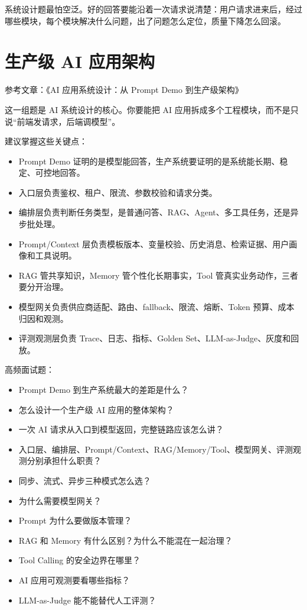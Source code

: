 \documentclass[10pt,a4paper]{ctexart}
\begin{document}
系统设计题最怕空泛。好的回答要能沿着一次请求说清楚：用户请求进来后，经过哪些模块，每个模块解决什么问题，出了问题怎么定位，质量下降怎么回滚。



\section{生产级 AI 应用架构}


参考文章：《AI 应用系统设计：从 Prompt Demo 到生产级架构》



这一组题是 AI 系统设计的核心。你要能把 AI 应用拆成多个工程模块，而不是只说“前端发请求，后端调模型”。



建议掌握这些关键点：


\begin{itemize}[itemsep=2pt, topsep=4pt]
  \item Prompt Demo 证明的是模型能回答，生产系统要证明的是系统能长期、稳定、可控地回答。
  \item 入口层负责鉴权、租户、限流、参数校验和请求分类。
  \item 编排层负责判断任务类型，是普通问答、RAG、Agent、多工具任务，还是异步批处理。
  \item Prompt/Context 层负责模板版本、变量校验、历史消息、检索证据、用户画像和工具说明。
  \item RAG 管共享知识，Memory 管个性化长期事实，Tool 管真实业务动作，三者要分开治理。
  \item 模型网关负责供应商适配、路由、fallback、限流、熔断、Token 预算、成本归因和观测。
  \item 评测观测层负责 Trace、日志、指标、Golden Set、LLM-as-Judge、灰度和回放。
\end{itemize}


高频面试题：


\begin{itemize}[itemsep=2pt, topsep=4pt]
  \item Prompt Demo 到生产系统最大的差距是什么？
  \item 怎么设计一个生产级 AI 应用的整体架构？
  \item 一次 AI 请求从入口到模型返回，完整链路应该怎么讲？
  \item 入口层、编排层、Prompt/Context、RAG/Memory/Tool、模型网关、评测观测分别承担什么职责？
  \item 同步、流式、异步三种模式怎么选？
  \item 为什么需要模型网关？
  \item Prompt 为什么要做版本管理？
  \item RAG 和 Memory 有什么区别？为什么不能混在一起治理？
  \item Tool Calling 的安全边界在哪里？
  \item AI 应用可观测要看哪些指标？
  \item LLM-as-Judge 能不能替代人工评测？
\end{itemize}
\end{document}
